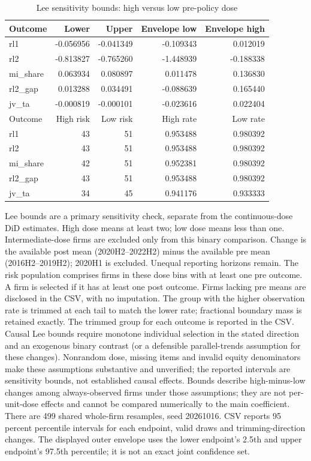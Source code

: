 \begin{table}[htbp]
\centering
\caption{Lee sensitivity bounds: high versus low pre-policy dose}
\label{tab:lee_bounds}
\begin{tabular}{lrrrr}
\toprule
Outcome & Lower & Upper & Envelope low & Envelope high \\
\midrule
rl1 & -0.056956 & -0.041349 & -0.109343 & 0.012019 \\
rl2 & -0.813827 & -0.765260 & -1.448939 & -0.188338 \\
mi\_share & 0.063934 & 0.080897 & 0.011478 & 0.136830 \\
rl2\_gap & 0.013288 & 0.034491 & -0.088639 & 0.165440 \\
jv\_ta & -0.000819 & -0.000101 & -0.023616 & 0.022404 \\
\midrule
Outcome & High risk & Low risk & High rate & Low rate \\
rl1 & 43 & 51 & 0.953488 & 0.980392 \\
rl2 & 43 & 51 & 0.953488 & 0.980392 \\
mi\_share & 42 & 51 & 0.952381 & 0.980392 \\
rl2\_gap & 43 & 51 & 0.953488 & 0.980392 \\
jv\_ta & 34 & 45 & 0.941176 & 0.933333 \\
\bottomrule
\end{tabular}
\end{table}
\par\smallskip
\noindent\begin{minipage}{\linewidth}\footnotesize
Lee bounds are a primary sensitivity check, separate from the continuous-dose DiD estimates. High dose means at least two; low dose means less than one. Intermediate-dose firms are excluded only from this binary comparison. Change is the available post mean (2020H2--2022H2) minus the available pre mean (2016H2--2019H2); 2020H1 is excluded. Unequal reporting horizons remain. The risk population comprises firms in these dose bins with at least one pre outcome. A firm is selected if it has at least one post outcome. Firms lacking pre means are disclosed in the CSV, with no imputation. The group with the higher observation rate is trimmed at each tail to match the lower rate; fractional boundary mass is retained exactly. The trimmed group for each outcome is reported in the CSV. Causal Lee bounds require monotone individual selection in the stated direction and an exogenous binary contrast (or a defensible parallel-trends assumption for these changes). Nonrandom dose, missing items and invalid equity denominators make these assumptions substantive and unverified; the reported intervals are sensitivity bounds, not established causal effects. Bounds describe high-minus-low changes among always-observed firms under those assumptions; they are not per-unit-dose effects and cannot be compared numerically to the main coefficient. There are 499 shared whole-firm resamples, seed 20261016. CSV reports 95 percent percentile intervals for each endpoint, valid draws and trimming-direction changes. The displayed outer envelope uses the lower endpoint's 2.5th and upper endpoint's 97.5th percentile; it is not an exact joint confidence set.
\end{minipage}
